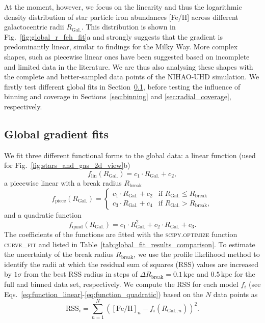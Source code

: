 \documentclass[twocolumn,apj,numberedappendix,appendixfloats,twocolappendix]{openjournal}
\begin{document}
\begin{CJK*}{UTF8}{gbsn}
At the moment, however, we focus on the linearity and thus the logarithmic density distribution of star particle iron abundances [Fe/H] across different galactocentric radii $R_\mathrm{Gal.}$. This distribution is shown in Fig.~\ref{fig:global_r_feh_fit}a and strongly suggests that the gradient is predominantly linear, similar to findings for the Milky Way. More complex shapes, such as piecewise linear ones have been suggested based on incomplete and limited data in the literature. We are thus also analysing these shapes with the complete and better-sampled data points of the NIHAO-UHD simulation. We firstly test different global fits in Section~\ref{sec:global_fits}, before testing the influence of binning and coverage in Sections~\ref{sec:binning} and \ref{sec:radial_coverage}, respectively.

\subsection{Global gradient fits}
\label{sec:global_fits}

We fit three different functional forms to the global data: a linear function (used for Fig.~\ref{fig:stars_and_gas_2d_view}b)
\begin{equation}
f_{\text{lin}}(R_\mathrm{Gal.}) = c_1 \cdot R_\mathrm{Gal.} + c_2, \label{eq:function_linear}
\end{equation}
a piecewise linear with a break radius $R_\mathrm{break}$
\begin{equation}
f_{\text{piece}}(R_\mathrm{Gal.}) = 
\begin{cases} 
c_1 \cdot R_\mathrm{Gal.} + c_2 & \text{if } R_\mathrm{Gal.} \leq R_\mathrm{break} \\
c_3 \cdot R_\mathrm{Gal.} + c_4 & \text{if } R_\mathrm{Gal.} > R_\mathrm{break},  \label{eq:function_piecewise}
\end{cases}
\end{equation}
and a quadratic function
\begin{equation}
f_{\text{quad}}(R_\mathrm{Gal.}) = c_1 \cdot R_\mathrm{Gal.}^2 + c_2 \cdot R_\mathrm{Gal.} + c_3.  \label{eq:function_quadratic}
\end{equation}
The coefficients of the functions are fitted with the \textsc{scipy.optimize} function \textsc{curve\_fit} \citep{Scipy} and listed in Table~\ref{tab:global_fit_results_comparison}. To estimate the uncertainty of the break radius $R_\mathrm{break}$, we use the profile likelihood method to identify the radii at which the residual sum of squares (RSS) values are increased by $1\sigma$ from the best RSS radius in steps of $\Delta R_\mathrm{break} = 0.1\,\mathrm{kpc}$ and $0.5\,\mathrm{kpc}$ for the full and binned data set, respectively. We compute the RSS for each model $f_i$ (see Eqs.~\ref{eq:function_linear}-\ref{eq:function_quadratic}) based on the $N$ data points as 
\begin{equation} \label{eq:rss}
    \mathrm{RSS}_i = \sum_{n=1}^N \left( \mathrm{[Fe/H]}_n - f_i(R_{\mathrm{Gal.},n}) \right)^2.
\end{equation}


\end{CJK*}
\end{document}
